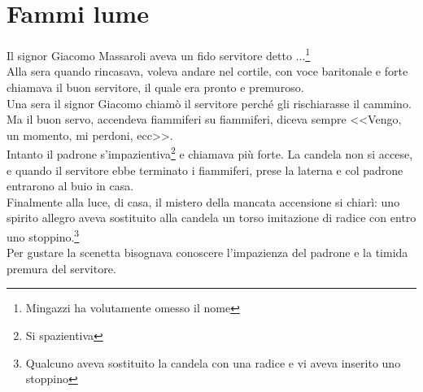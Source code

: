 
\chapter{Fammi lume}
Il signor Giacomo Massaroli aveva un fido servitore detto ...\footnote{Mingazzi ha volutamente omesso il nome}\\
Alla sera quando rincasava, voleva andare nel cortile, con voce baritonale e forte chiamava il buon servitore, il quale era pronto e premuroso.\\
\indent Una sera il signor Giacomo chiamò il servitore perché gli rischiarasse il cammino. Ma il buon servo, accendeva fiammiferi su fiammiferi, diceva sempre <<Vengo, un momento, mi perdoni, ecc>>.\\
\indent Intanto il padrone s'impazientiva\footnote{Si spazientiva} e chiamava più forte. La candela non si accese, e quando il servitore ebbe terminato i fiammiferi, prese la laterna e col padrone entrarono al buio in casa.\\
\indent Finalmente alla luce, di casa, il mistero della mancata accensione si chiarì: uno spirito allegro aveva sostituito alla candela un torso imitazione di radice con entro uno stoppino.\footnote{Qualcuno aveva sostituito la candela con una radice e vi aveva inserito uno stoppino}\\
\indent Per gustare la scenetta bisognava conoscere l'impazienza del padrone e la timida premura del servitore.


